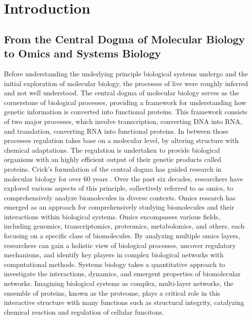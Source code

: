 \documentclass[
]{article}
\author{}
\date{\vspace{-2.5em}}
\begin{document}
\hypertarget{introduction}{%
\section{Introduction}\label{introduction}}

\hypertarget{from-the-central-dogma-of-molecular-biology-to-omics-and-systems-biology}{%
\subsection{From the Central Dogma of Molecular Biology to Omics and
Systems
Biology}\label{from-the-central-dogma-of-molecular-biology-to-omics-and-systems-biology}}

Before understanding the underlying principle biological systems undergo
and the initial exploration of molecular biology, the processes of live
were roughly inferred and not well understood. The central dogma of
molecular biology serves as the cornerstone of biological processes,
providing a framework for understanding how genetic information is
converted into functional proteins. This framework consists of two major
processes, which involve transcription, converting DNA into RNA, and
translation, converting RNA into functional proteins. In between those
processes regulation takes base on a molecular level, by altering
structure with chemical adaptations. The regulation is undertaken to
provide biological organisms with an highly efficient output of their
genetic products called proteins. Crick's formulation of the central
dogma has guided research in molecular biology for over 60 years
\citep{Cobb2017}. Over the past six decades, researchers have explored
various aspects of this principle, collectively referred to as omics, to
comprehensively analyze biomolecules in diverse contexts. Omics research
has emerged as an approach for comprehensively studying biomolecules and
their interactions within biological systems. Omics encompasses various
fields, including genomics, transcriptomics, proteomics, metabolomics,
and others, each focusing on a specific class of biomolecules. By
analyzing multiple omics layers, researchers can gain a holistic view of
biological processes, uncover regulatory mechanisms, and identify key
players in complex biological networks with computational methods.
Systems biology takes a quantitative approach to investigate the
interactions, dynamics, and emergent properties of biomolecular
networks. Imagining biological systems as complex, multi-layer networks,
the ensemble of proteins, known as the proteome, plays a critical role
in this interactive structure with many functions such as structural
integrity, catalyzing chemical reaction and regulation of cellular
funcitons.
\end{document}
